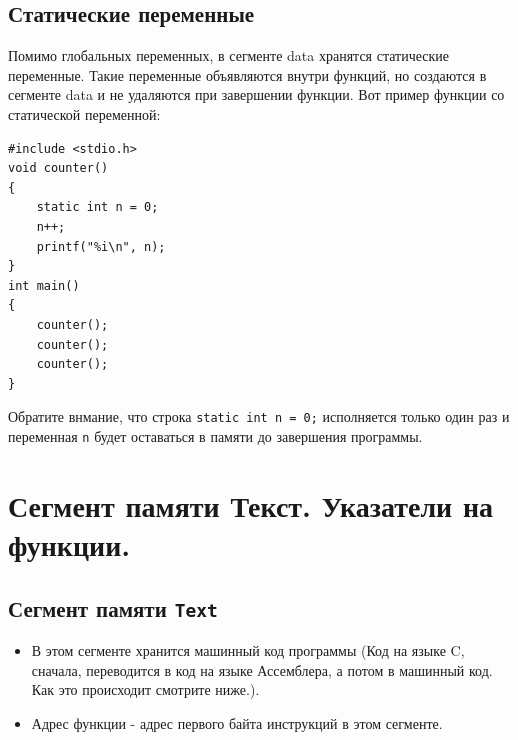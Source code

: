 \documentclass{article}
\begin{document}
\subsection*{Статические переменные}
Помимо глобальных переменных, в сегменте data хранятся статические переменные. Такие переменные объявляются внутри функций, но создаются в сегменте data и не удаляются при завершении функции. Вот пример функции со статической переменной:
\begin{lstlisting}
#include <stdio.h>
void counter() 
{
    static int n = 0;
    n++;
    printf("%i\n", n);
}
int main() 
{
    counter();
    counter();
    counter();
}
\end{lstlisting}
Обратите внмание, что строка \texttt{static int n = 0;} исполняется только один раз и переменная \texttt{n} будет оставаться в памяти до завершения программы.



\newpage
\section*{Сегмент памяти Текст. Указатели на функции.}

\subsection*{Сегмент памяти \texttt{Text}}
\begin{itemize}
\item В этом сегменте хранится машинный код программы (Код на языке C, сначала, переводится в код на языке Ассемблера, а потом в машинный код. Как это происходит смотрите ниже.).
\item Адрес функции - адрес первого байта инструкций в этом сегменте.
\end{itemize}
\end{document}
